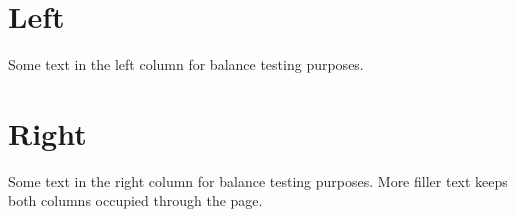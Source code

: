 \documentclass[twocolumn]{article}
\begin{document}
\balance
\section{Left}
Some text in the left column for balance testing purposes.
\section{Right}
Some text in the right column for balance testing purposes.
More filler text keeps both columns occupied through the page.
\end{document}
